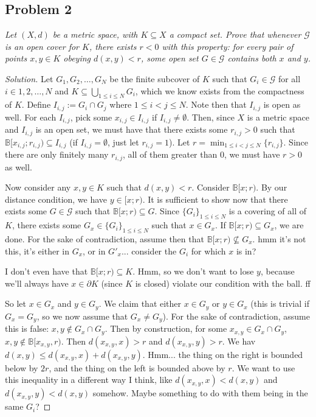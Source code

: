 \documentclass{article}
\begin{document}
\subsection*{Problem 2}
{\it Let $(X, d)$ be a metric space, with $K \subseteq X$ a compact set.
Prove that whenever $\mathcal{G}$ is an open cover for $K$,
there exists $r < 0$ with this property:
for every pair of points $x,y \in K$ obeying $d(x,y) < r$,
some open set $G \in \mathcal{G}$ contains both $x$ and $y$.}

\begin{proof}[Solution]\let\qed\relax
	Let $G_1, G_2, \dots, G_N$ be the finite subcover of $K$
	such that $G_i \in \mathcal{G}$ for all $i \in 1,2,\dots,N$
	and $K \subseteq \bigcup_{1\leq i \leq N}G_i$,
	which we know exists from the compactness of $K$.
	Define $I_{i,j} := G_i \cap G_j$ where $1 \leq i < j \leq N$.
	Note then that $I_{i,j}$ is open as well.
	For each $I_{i,j}$, pick some $x_{i,j} \in I_{i,j}$ if $I_{i,j} \neq \emptyset$.
	Then, since $X$ is a metric space and $I_{i,j}$ is an open set,
	we must have that there exists some $r_{i,j} > 0$
	such that $\mathbb{B}[x_{i,j};r_{i,j}) \subseteq I_{i,j}$
	(if $I_{i,j} = \emptyset$, just let $r_{i,j} = 1$).
	Let $r = \min_{1\leq i<j\leq N}\{r_{i,j}\}$.
	Since there are only finitely many $r_{i,j}$, all of them greater than $0$,
	we must have $r > 0$ as well.
	
	Now consider any $x,y \in K$ such that $d(x,y) < r$.
	Consider $\mathbb{B}[x;r)$.
	By our distance condition, we have $y \in \mathbb[x;r)$.
	It is sufficient to show now that there exists some $G \in \mathcal{G}$
	such that $\mathbb{B}[x;r) \subseteq G$.
	Since $\{G_i\}_{1\leq i\leq N}$ is a covering of all of $K$,
	there exists some $G_x \in \{G_i\}_{1\leq i\leq N}$ such that $x \in G_x$.
	If $\mathbb{B}[x;r) \subseteq G_x$, we are done.
	For the sake of contradiction, assume then that $\mathbb{B}[x;r) \not\subseteq G_x$.
	hmm it's not this, it's either in $G_x$, or in $G'_x$...
	consider the $G_i$ for which $x$ is in?

	I don't even have that $\mathbb{B}[x;r) \subseteq K$.
	Hmm, so we don't want to lose $y$, because we'll always have
	$x \in \partial K$ (since $K$ is closed) violate our condition with the ball.
	ff

	So let $x \in G_x$ and $y \in G_y$.
	We claim that either $x \in G_y$ or $y \in G_x$
	(this is trivial if $G_x = G_y$, so we now assume that $G_x \neq G_y$).
	For the sake of contradiction, assume this is false:
	$x, y \not\in G_x \cap G_y$.
	Then by construction, for some $x_{x,y} \in G_x \cap G_y$,
	$x,y \not\in \mathbb{B}[x_{x,y},r)$.
	Then $d(x_{x,y},x) > r$ and $d(x_{x,y},y) > r$.
	We hav $d(x,y) \leq d(x_{x,y},x) + d(x_{x,y},y)$.
	Hmm... the thing on the right is bounded below by $2r$,
	and the thing on the left is bounded above by $r$.
	We want to use this inequality in a different way I think,
	like $d(x_{x,y},x) < d(x,y)$ and $d(x_{x,y},y) < d(x,y)$ somehow.
	Maybe something to do with them being in the same $G_i$?


\end{proof}
\end{document}

